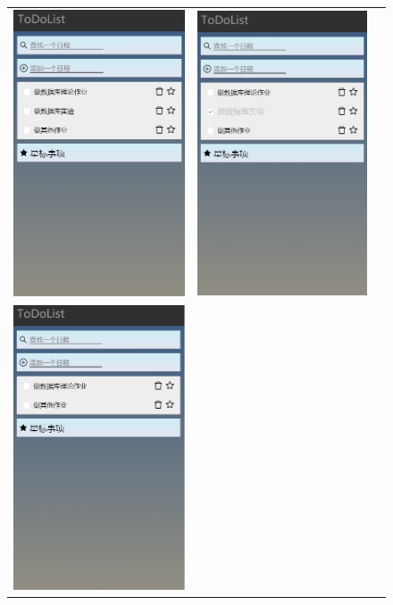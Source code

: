 \documentclass[logo,reportComp]{thesis}
\begin{document}
\begin{figure}[H]
\centering
\begin{tabular}{ccc}
\includegraphics[width=0.4\linewidth]{fig/add.png}&
\includegraphics[width=0.4\linewidth]{fig/finish.png}\\
\includegraphics[width=0.4\linewidth]{fig/delete.png}&

\end{tabular}
\end{figure}
\end{document}

